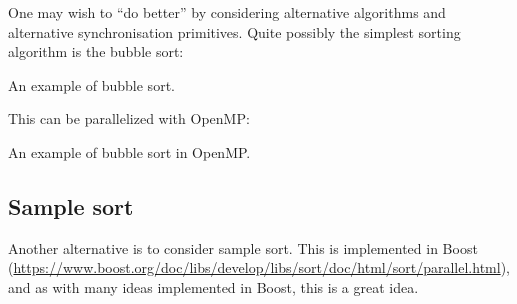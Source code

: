 One may wish to ``do better'' by considering alternative algorithms and alternative synchronisation primitives. Quite possibly the simplest sorting algorithm is the bubble sort: 

\begin{codebox}[breakable]{}
\footnotesize An example of bubble sort.
\tcblower
{}
\end{codebox}

This can be parallelized with OpenMP:

\begin{codebox}[breakable]{}
\footnotesize An example of bubble sort in OpenMP.
\tcblower
{}
\end{codebox}

\subsection{Sample sort}
 

Another alternative is to consider sample sort. This is implemented in Boost 
(\url{https://www.boost.org/doc/libs/develop/libs/sort/doc/html/sort/parallel.html}), 
and as with many ideas implemented in Boost, this is a great idea. 


